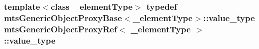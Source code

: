 \hypertarget{classmts_generic_object_proxy_ref_af50eac4bbf86d9609d7cd77c33d4bf54}{
\subsubsection[{value\-\_\-type}]{\setlength{\rightskip}{0pt plus 5cm}template$<$class \-\_\-element\-Type$>$ typedef {\bf mts\-Generic\-Object\-Proxy\-Base}$<$\-\_\-element\-Type$>$\-::{\bf value\-\_\-type} {\bf mts\-Generic\-Object\-Proxy\-Ref}$<$ \-\_\-element\-Type $>$\-::{\bf value\-\_\-type}}}\label{classmts_generic_object_proxy_ref_af50eac4bbf86d9609d7cd77c33d4bf54}


